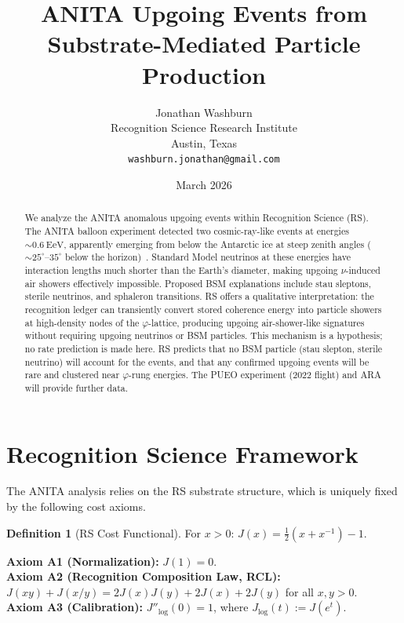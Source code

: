 \documentclass[12pt,a4paper]{article}
\title{ANITA Upgoing Events from\\
Substrate-Mediated Particle Production}
\author{Jonathan Washburn\\
Recognition Science Research Institute\\
Austin, Texas\\
\texttt{washburn.jonathan@gmail.com}}
\date{March 2026}
\theoremstyle{definition}
\newtheorem{definition}[theorem]{Definition}
\theoremstyle{remark}
\begin{document}
\maketitle

\begin{abstract}
We analyze the ANITA anomalous upgoing events within Recognition
Science (RS).  The ANITA balloon experiment detected two
cosmic-ray-like events at energies $\sim 0.6~\mathrm{EeV}$, apparently
emerging from below the Antarctic ice at steep zenith angles
($\sim 25^\circ$--$35^\circ$ below the horizon)~\cite{ANITA2016,
ANITA2018}.  Standard Model neutrinos at these energies have
interaction lengths much shorter than the Earth's diameter, making
upgoing $\nu$-induced air showers effectively impossible.  Proposed BSM
explanations include stau sleptons, sterile neutrinos, and sphaleron
transitions.  RS offers a qualitative interpretation: the recognition ledger can
transiently convert stored coherence energy into particle showers at
high-density nodes of the $\varphi$-lattice, producing upgoing
air-shower-like signatures without requiring upgoing neutrinos or
BSM particles.  This mechanism is a hypothesis; no rate prediction
is made here.  RS predicts that no BSM particle (stau slepton, sterile
neutrino) will account for the events, and that any confirmed upgoing
events will be rare and clustered near $\varphi$-rung energies.  The
PUEO experiment (2022 flight) and ARA will provide further data.
\end{abstract}

\section{Recognition Science Framework}
\label{sec:framework}

The ANITA analysis relies on the RS substrate structure, which is
uniquely fixed by the following cost axioms.

\begin{definition}[RS Cost Functional]
For $x > 0$: $J(x) = \tfrac{1}{2}(x + x^{-1}) - 1$.
\end{definition}

\noindent\textbf{Axiom A1 (Normalization):} $J(1) = 0$.\\
\textbf{Axiom A2 (Recognition Composition Law, RCL):}
$J(xy)+J(x/y)=2J(x)J(y)+2J(x)+2J(y)$ for all $x,y>0$.\\
\textbf{Axiom A3 (Calibration):} $J''_{\log}(0) = 1$, where
$J_{\log}(t) := J(e^t)$.
\end{document}

